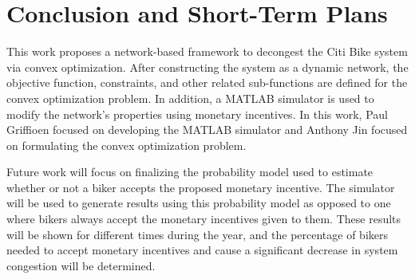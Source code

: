 \documentclass[times, 10pt,twocolumn]{article}
\begin{document}



\section{Conclusion and Short-Term Plans}
This work proposes a network-based framework to decongest the Citi Bike system via convex optimization. After constructing the system as a dynamic network, the objective function, constraints, and other related sub-functions are defined for the convex optimization problem. In addition, a MATLAB simulator is used to modify the network's properties using monetary incentives. In this work, Paul Griffioen focused on developing the MATLAB simulator and Anthony Jin focused on formulating the convex optimization problem.

Future work will focus on finalizing the probability model used to estimate whether or not a biker accepts the proposed monetary incentive. The simulator will be used to generate results using this probability model as opposed to one where bikers always accept the monetary incentives given to them. These results will be shown for different times during the year, and the percentage of bikers needed to accept monetary incentives and cause a significant decrease in system congestion will be determined.

\end{document}
